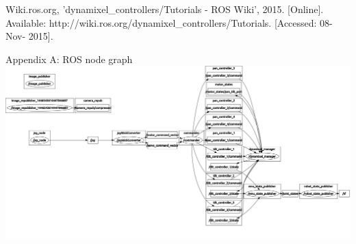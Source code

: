 \documentclass[titlepage,12pt,a4paper]{article}
\begin{document}
\noindent [4] Wiki.ros.org, 'dynamixel\_controllers/Tutorials - ROS Wiki', 2015. [Online].\\
Available: http://wiki.ros.org/dynamixel\_controllers/Tutorials. [Accessed: 08- Nov- 2015].\\


\newpage
\begin{appendices}
Appendix A: ROS node graph\\
\includegraphics[width=\textheight,angle=90,origin=c]{rosgraph.pdf}

\end{appendices}
\end{document}
